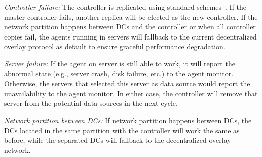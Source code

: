 \begin{packedenumerate}
\item \emph{Controller failure:} The controller is replicated using standard schemes~\cite{lamport1998part}. If the master controller fails, another replica will be elected as the new controller. If the network partition happens between DCs and the controller or when all controller copies fail, the agents running in servers will fallback to the current decentralized overlay protocol as default to ensure graceful performance degradation.
\item \emph{Server failure:} If the agent on server is still able to work, it will report the abnormal state (e.g., server crash, disk failure, etc.) to the agent monitor. Otherwise, the servers that selected this server as data source would report the unavailability to the agent monitor. In either case, the controller will remove that server from the potential data sources in the next cycle.
\item \emph{Network partition between DCs:}
If network partition happens between DCs, the DCs located in the same partition with the controller will work the same as before, while the separated DCs will fallback to the decentralized overlay network.
\end{packedenumerate}
%
%
%
%
%



